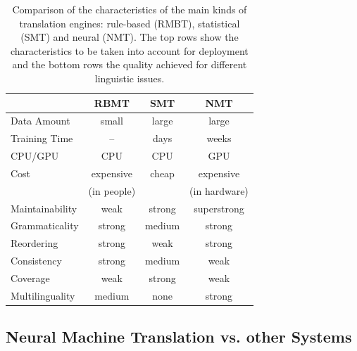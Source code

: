 \documentclass[a4paper,11pt]{article}
\begin{document}
\begin{table}[t]
\begin{center}
 \begin{tabular}{lccc}
  \toprule
                  & {\bf RBMT} & {\bf SMT} & {\bf NMT}\\
   \midrule
  Data Amount     & small & large & large\\
  Training Time   &   --  & {\color{greenp}days} & {\color{crimson}weeks}\\
  CPU/GPU         & CPU   & CPU  & {\color{crimson}GPU}\\
  Cost            & {\color{crimson}expensive}  & {\color{greenp}cheap} & expensive  \\ 
                  & {\color{crimson}(in people)} &  &  (in hardware) \\ 
  Maintainability &  weak & strong  & {\color{greenp}superstrong} \\
 \midrule
  Grammaticality  & {\color{greenp}strong} & medium & {\color{greenp}strong}\\
  Reordering      & strong & {\color{crimson}weak} & strong\\
  Consistency     & {\color{greenp}strong} & medium & {\color{crimson}weak}\\
  Coverage        & {\color{crimson}weak}   & {\color{greenp}strong} & weak\\
  Multilinguality  & medium & none  & {\color{greenp}strong} \\
  \bottomrule
\end{tabular}
\end{center}
 \caption{Comparison of the characteristics of the main kinds of translation engines: rule-based (RMBT), statistical (SMT) and neural (NMT). The top rows show  the characteristics to be taken into account for deployment and the bottom rows the quality achieved for different linguistic issues.}
 \label{tab:comparison} 
\end{table}




\subsection{Neural Machine Translation vs. other Systems}
\label{ss:comparison}
\end{document}
